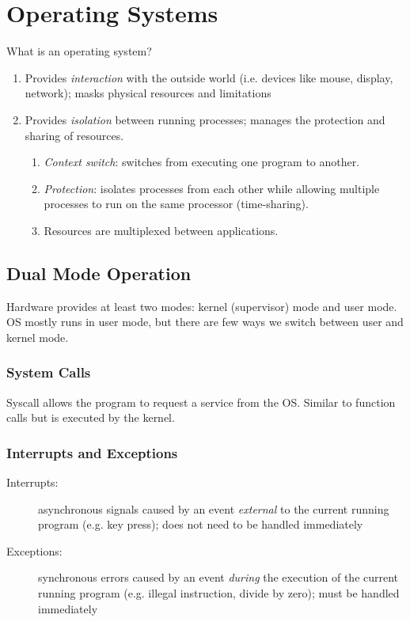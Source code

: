 \chapter{Operating Systems}

What is an operating system?
\begin{enumerate}
	\item Provides \emph{interaction} with the outside world (i.e. devices like mouse, display, network); masks physical resources and limitations
	\item Provides \emph{isolation} between running processes; manages the protection and sharing of resources.
	\begin{enumerate}
	    \item \emph{Context switch}: switches from executing one program to another.
	    \item \emph{Protection}: isolates processes from each other while allowing multiple processes to run on the same processor (time-sharing).
		\item Resources are multiplexed between applications.
	\end{enumerate}
\end{enumerate}

\section{Dual Mode Operation}

Hardware provides at least two modes: kernel (supervisor) mode and user mode. OS mostly runs in user mode, but there are few ways we switch between user and kernel mode.

\subsection{System Calls}
Syscall allows the program to request a service from the OS. Similar to function calls but is executed by the kernel.

\subsection{Interrupts and Exceptions}
\begin{description}
    \item[Interrupts:] asynchronous signals caused by an event \emph{external} to the current running program (e.g. key press); does not need to be handled immediately
    \item[Exceptions:] synchronous errors caused by an event \emph{during} the execution of the current running program (e.g. illegal instruction, divide by zero); must be handled immediately
\end{description}

